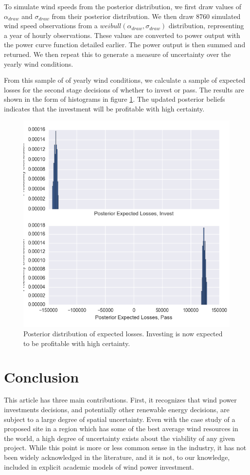 \documentclass[11pt]{article}
\begin{document}
To simulate wind speeds from the posterior distribution, we first draw values of $\alpha_{draw}$ and $\sigma_{draw}$ from their posterior distribution. We then draw 8760 simulated wind speed observations from a $weibull(\alpha_{draw}, \sigma_{draw})$ distribution, representing a year of hourly observations. These values are converted to power output with the power curve function detailed earlier. The power output is then summed and returned. We then repeat this to generate a measure of uncertainty over the yearly wind conditions.

From this sample of of yearly wind conditions, we calculate a sample of expected losses for the second stage decisions of whether to invest or pass. The results are shown in the form of histograms in figure \ref{post_losses}. The updated posterior beliefs indicates that the investment will be profitable with high certainty. 

\begin{figure}
	\centering
	\includegraphics[width=.8\textwidth]{figures/post_losses.png}
	\caption{Posterior distribution of expected losses. Investing is now expected to be profitable with high certainty.}
	\label{post_losses}
\end{figure}


\section{Conclusion}
This article has three main contributions. First, it recognizes that wind power investments decisions, and potentially other renewable energy decisions, are subject to a large degree of spatial uncertainty. Even with the case study of a proposed site in a region which has some of the best average wind resources in the world, a high degree of uncertainty exists about the viability of any given project. While this point is more or less common sense in the industry, it has not been widely acknowledged in the literature, and it is not, to our knowledge, included in explicit academic models of wind power investment. 
\end{document}
